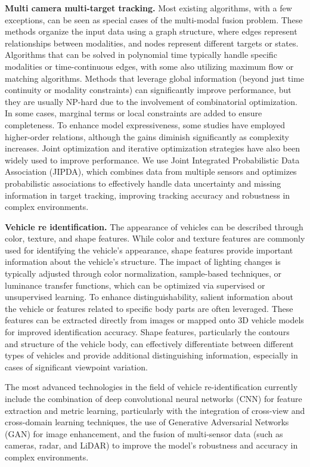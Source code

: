 \textbf{Multi camera multi-target tracking.}
Most existing algorithms, with a few exceptions, can be seen as special cases of the multi-modal fusion problem. 
These methods organize the input data using a graph structure, where edges represent relationships between modalities, and nodes represent different targets or states. 
Algorithms that can be solved in polynomial time typically handle specific modalities or time-continuous edges, with some also utilizing maximum flow or matching algorithms. 
Methods that leverage global information (beyond just time continuity or modality constraints) can significantly improve performance, but they are usually NP-hard due to the involvement of combinatorial optimization. 
In some cases, marginal terms or local constraints are added to ensure completeness. 
To enhance model expressiveness, some studies have employed higher-order relations, although the gains diminish significantly as complexity increases. 
Joint optimization and iterative optimization strategies have also been widely used to improve performance.
We use Joint Integrated Probabilistic Data Association (JIPDA), which combines data from multiple sensors and optimizes probabilistic associations to effectively handle data uncertainty and missing information in target tracking, improving tracking accuracy and robustness in complex environments.


\textbf{Vehicle re identification.}
The appearance of vehicles can be described through color, texture, and shape features. 
While color and texture features are commonly used for identifying the vehicle's appearance, shape features provide important information about the vehicle's structure. 
The impact of lighting changes is typically adjusted through color normalization, sample-based techniques, or luminance transfer functions, which can be optimized via supervised or unsupervised learning. 
To enhance distinguishability, salient information about the vehicle or features related to specific body parts are often leveraged. 
These features can be extracted directly from images or mapped onto 3D vehicle models for improved identification accuracy. 
Shape features, particularly the contours and structure of the vehicle body, can effectively differentiate between different types of vehicles and provide additional distinguishing information, especially in cases of significant viewpoint variation.

The most advanced technologies in the field of vehicle re-identification currently include the combination of deep convolutional neural networks (CNN) for feature extraction and metric learning, particularly with the integration of cross-view and cross-domain learning techniques, the use of Generative Adversarial Networks (GAN) for image enhancement, and the fusion of multi-sensor data (such as cameras, radar, and LiDAR) to improve the model's robustness and accuracy in complex environments.

